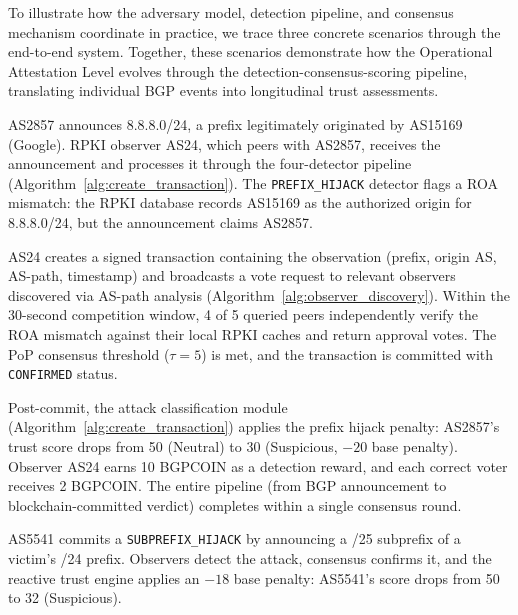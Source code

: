 


To illustrate how the adversary model, detection pipeline, and consensus mechanism coordinate in practice, we trace three concrete scenarios through the end-to-end system. Together, these scenarios demonstrate how the Operational Attestation Level evolves through the detection-consensus-scoring pipeline, translating individual BGP events into longitudinal trust assessments.

AS2857 announces 8.8.8.0/24, a prefix legitimately originated by AS15169 (Google). RPKI observer AS24, which peers with AS2857, receives the announcement and processes it through the four-detector pipeline (Algorithm~\ref{alg:create_transaction}). The \texttt{PREFIX\_HIJACK} detector flags a ROA mismatch: the RPKI database records AS15169 as the authorized origin for 8.8.8.0/24, but the announcement claims AS2857.

AS24 creates a signed transaction containing the observation (prefix, origin AS, AS-path, timestamp) and broadcasts a vote request to relevant observers discovered via AS-path analysis (Algorithm~\ref{alg:observer_discovery}). Within the 30-second competition window, 4 of 5 queried peers independently verify the ROA mismatch against their local RPKI caches and return approval votes. The PoP consensus threshold ($\tau = 5$) is met, and the transaction is committed with \texttt{CONFIRMED} status.

Post-commit, the attack classification module (Algorithm~\ref{alg:create_transaction}) applies the prefix hijack penalty: AS2857's trust score drops from 50 (Neutral) to 30 (Suspicious, $-20$ base penalty). Observer AS24 earns 10 BGPCOIN as a detection reward, and each correct voter receives 2 BGPCOIN. The entire pipeline (from BGP announcement to blockchain-committed verdict) completes within a single consensus round.

AS5541 commits a \texttt{SUBPREFIX\_HIJACK} by announcing a /25 subprefix of a victim's /24 prefix. Observers detect the attack, consensus confirms it, and the reactive trust engine applies an $-18$ base penalty: AS5541's score drops from 50 to 32 (Suspicious).

